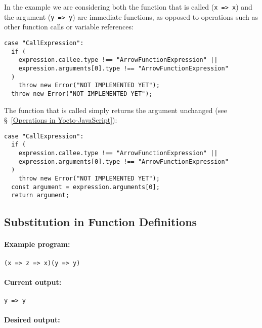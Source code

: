 \documentclass[12pt, oneside]{book}
\begin{document}
In the example we are considering both the function that is called (\texttt{x => x}) and the argument (\texttt{y => y}) are immediate functions, as opposed to operations such as other function calls or variable references:

\begin{verbatim}
case "CallExpression":
  if (
    expression.callee.type !== "ArrowFunctionExpression" ||
    expression.arguments[0].type !== "ArrowFunctionExpression"
  )
    throw new Error("NOT IMPLEMENTED YET");
  throw new Error("NOT IMPLEMENTED YET");
\end{verbatim}

The function that is called simply returns the argument unchanged (see §~\ref{Operations in Yocto-JavaScript}):

\begin{verbatim}
case "CallExpression":
  if (
    expression.callee.type !== "ArrowFunctionExpression" ||
    expression.arguments[0].type !== "ArrowFunctionExpression"
  )
    throw new Error("NOT IMPLEMENTED YET");
  const argument = expression.arguments[0];
  return argument;
\end{verbatim}

\subsection{Substitution in Function Definitions}
\label{Substitution in Function Definitions}

\paragraph{Example program:}

\begin{verbatim}
(x => z => x)(y => y)
\end{verbatim}

\paragraph{Current output:}

\begin{verbatim}
y => y
\end{verbatim}

\paragraph{Desired output:}
\end{document}
